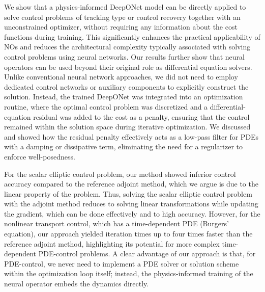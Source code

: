 \documentclass[final,1p,times]{elsarticle}
\theoremstyle{plain} %
\theoremstyle{definition} %
\theoremstyle{remark} %
\begin{document}
We show that a physics-informed DeepONet model can be directly applied to solve control problems of tracking type or control recovery together with an unconstrained optimizer, without requiring any information about the cost functions during training. This significantly enhances the practical applicability of NOs and reduces the architectural complexity typically associated with solving control problems using neural networks. Our results further show that neural operators can be used beyond their original role as differential equation solvers. Unlike conventional neural network approaches, we did not need to employ dedicated control networks or auxiliary components to explicitly construct the solution. Instead, the trained DeepONet was integrated into an optimization routine, where the optimal control problem was discretized and a differential-equation residual was added to the cost as a penalty, ensuring that the control remained within the solution space during iterative optimization. We discussed and showed how the residual penalty effectively acts as a low-pass filter for PDEs with a damping or dissipative term, eliminating the need for a regularizer to enforce well-posedness.

For the scalar elliptic control problem, our method showed inferior control accuracy compared to the reference adjoint method, which we argue is due to the linear property of the problem. Thus, solving the scalar elliptic control problem with the adjoint method reduces to solving linear transformations while updating the gradient, which can be done effectively and to high accuracy. However, for the nonlinear transport control, which has a time-dependent PDE (Burgers’ equation), our approach yielded iteration times up to four times faster than the reference adjoint method, highlighting its potential for more complex time-dependent PDE-control problems. A clear advantage of our approach is that, for PDE-control, we never need to implement a PDE solver or solution scheme within the optimization loop itself; instead, the physics-informed training of the neural operator embeds the dynamics directly.
\end{document}
